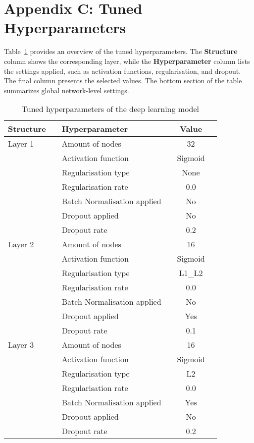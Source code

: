 \documentclass[a4paper,11pt]{report}
\begin{document}
\section*{Appendix C: Tuned Hyperparameters}\label{Appendix C}
Table~\ref{tab:hyperparameters} provides an overview of the tuned hyperparameters. The \textbf{Structure} column shows the corresponding layer, while the \textbf{Hyperparameter} column lists the settings applied, such as activation functions, regularisation, and dropout. The final column presents the selected values. The bottom section of the table summarizes global network-level settings.

\begin{table}[htbp]
\begin{center}
\caption{Tuned hyperparameters of the deep learning model}
\label{tab:hyperparameters}
\begin{tabular}{llllcl}
\toprule
\textbf{Structure} & & \textbf{Hyperparameter} & & \textbf{Value} & \\ \midrule

Layer 1 && Amount of nodes && 32 & \\
        && Activation function && Sigmoid & \\
        && Regularisation type && None & \\
        && Regularisation rate && 0.0 & \\
        && Batch Normalisation applied && No & \\
        && Dropout applied && No & \\
        && Dropout rate && 0.2 & \\

Layer 2 && Amount of nodes && 16 & \\
        && Activation function && Sigmoid & \\
        && Regularisation type && L1\_L2 & \\
        && Regularisation rate && 0.0 & \\
        && Batch Normalisation applied && No & \\
        && Dropout applied && Yes & \\
        && Dropout rate && 0.1 & \\

Layer 3 && Amount of nodes && 16 & \\
        && Activation function && Sigmoid & \\
        && Regularisation type && L2 & \\
        && Regularisation rate && 0.0 & \\
        && Batch Normalisation applied && Yes & \\
        && Dropout applied && No & \\
        && Dropout rate && 0.2 & \\


\end{tabular}
\end{center}
\end{table}
\end{document}
